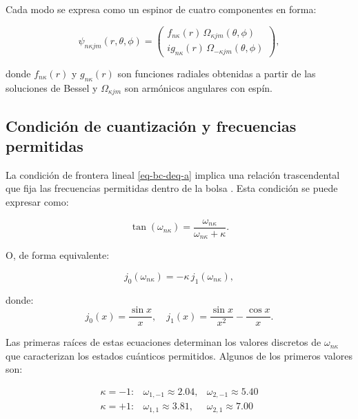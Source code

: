 Cada modo se expresa como un espinor de cuatro componentes en forma:

\begin{equation}
\psi_{n\kappa jm}(r, \theta, \phi) = 
\begin{pmatrix}
f_{n\kappa}(r) \, \Omega_{\kappa jm}(\theta,\phi) \\
i g_{n\kappa}(r) \, \Omega_{-\kappa jm}(\theta,\phi)
\end{pmatrix},
\end{equation}

donde $f_{n\kappa}(r)$ y $g_{n\kappa}(r)$ son funciones radiales obtenidas a partir de las soluciones de Bessel y $\Omega_{\kappa jm}$ son armónicos angulares con espín.

\subsection*{Condición de cuantización y frecuencias permitidas}

La condición de frontera lineal \eqref{eq-bc-deq-a} implica una relación trascendental que fija las frecuencias permitidas dentro de la bolsa \cite{Joseph1981, Chodos_1974, Lagerkvist_2015}. Esta condición se puede expresar como:

\begin{equation} \label{eq:cuantizacion}
\tan(\omega_{n\kappa}) = \frac{\omega_{n\kappa}}{\omega_{n\kappa} + \kappa}.
\end{equation}

O, de forma equivalente:

\begin{equation} \label{eq:bessel-cuanti}
j_0(\omega_{n\kappa}) = - \kappa \, j_1(\omega_{n\kappa}),
\end{equation}

donde:
\[
j_0(x) = \frac{\sin x}{x}, \quad j_1(x) = \frac{\sin x}{x^2} - \frac{\cos x}{x}.
\]

Las primeras raíces de estas ecuaciones determinan los valores discretos de $\omega_{n\kappa}$ que caracterizan los estados cuánticos permitidos. Algunos de los primeros valores son:

\[
\begin{array}{ccc}
\kappa = -1: & \omega_{1,-1} \approx 2.04, & \omega_{2,-1} \approx 5.40 \\
\kappa = +1: & \omega_{1,1} \approx 3.81, & \omega_{2,1} \approx 7.00
\end{array}
\]


